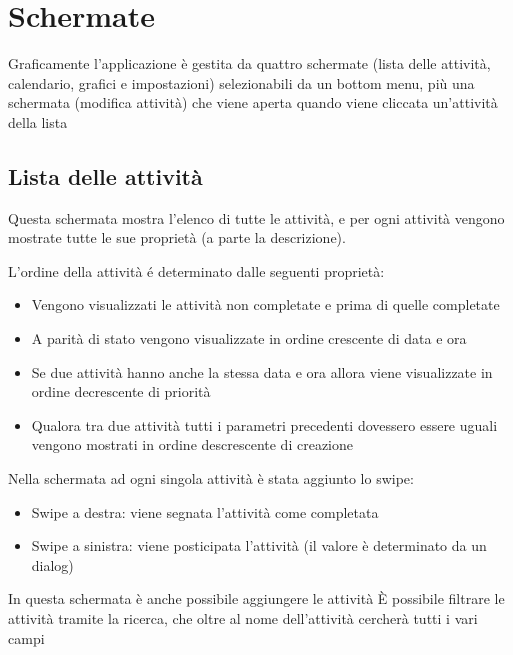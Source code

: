 \documentclass[]{article}
\providecommand{\tightlist}{%
  \setlength{\itemsep}{0pt}\setlength{\parskip}{0pt}}
\begin{document}
\hypertarget{schermate}{%
\section{Schermate}\label{schermate}}

Graficamente l'applicazione è gestita da quattro schermate (lista delle
attività, calendario, grafici e impostazioni) selezionabili da un bottom
menu, più una schermata (modifica attività) che viene aperta quando
viene cliccata un'attività della lista

\hypertarget{lista-delle-attivitaux300}{%
\subsection{Lista delle attività}\label{lista-delle-attivitaux300}}

Questa schermata mostra l'elenco di tutte le attività, e per ogni
attività vengono mostrate tutte le sue proprietà (a parte la
descrizione).

L'ordine della attività é determinato dalle seguenti proprietà:

\begin{itemize}
\tightlist
\item
  Vengono visualizzati le attività non completate e prima di quelle
  completate
\item
  A parità di stato vengono visualizzate in ordine crescente di data e
  ora
\item
  Se due attività hanno anche la stessa data e ora allora viene
  visualizzate in ordine decrescente di priorità
\item
  Qualora tra due attività tutti i parametri precedenti dovessero essere
  uguali vengono mostrati in ordine descrescente di creazione
\end{itemize}

Nella schermata ad ogni singola attività è stata aggiunto lo swipe:

\begin{itemize}
\tightlist
\item
  Swipe a destra: viene segnata l'attività come completata
\item
  Swipe a sinistra: viene posticipata l'attività (il valore è
  determinato da un dialog)
\end{itemize}

In questa schermata è anche possibile aggiungere le attività È possibile
filtrare le attività tramite la ricerca, che oltre al nome dell'attività
cercherà tutti i vari campi
\end{document}
